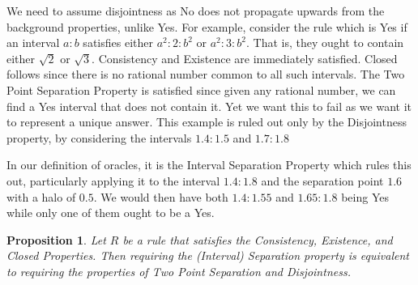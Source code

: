 \documentclass[12pt]{article}
\newtheorem{proposition}{Proposition}[subsection]
\begin{document}
We need to assume disjointness as No does not propagate upwards from the background properties, unlike Yes. For example, consider the rule which is Yes if an interval $a:b$ satisfies either $a^2:2:b^2$ or $a^2:3:b^2$. That is, they ought to contain either $\sqrt{2}$ or $\sqrt{3}$. Consistency and Existence are immediately satisfied. Closed follows since there is no rational number common to all such intervals. The Two Point Separation Property is satisfied since given any rational number, we can find a Yes interval that does not contain it. Yet we want this to fail as we want it to represent a unique answer. This example is ruled out only by the Disjointness property, by considering the intervals $1.4:1.5$ and $1.7:1.8$

In our definition of oracles, it is the Interval Separation Property which rules this out, particularly applying it to the interval $1.4:1.8$ and the separation point $1.6$ with a halo of $0.5$. We would then have both $1.4:1.55$ and $1.65:1.8$ being Yes while only one of them ought to be a Yes. 

\begin{proposition}
    Let $R$ be a rule that satisfies the Consistency, Existence, and Closed Properties. Then requiring the (Interval) Separation property is equivalent to requiring the properties of Two Point Separation and Disjointness. 
\end{proposition}
\end{document}

